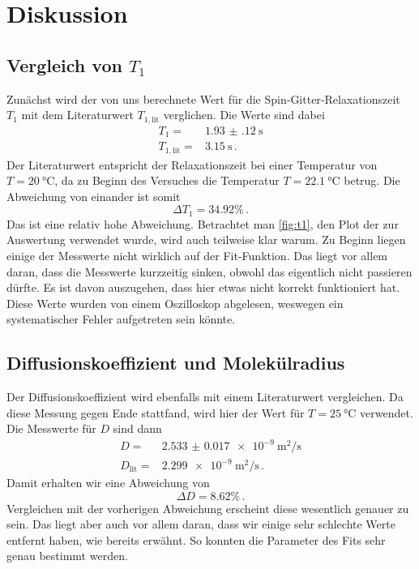 \section{Diskussion}
\label{sec:Diskussion}

\subsection{Vergleich von $T_1$}

Zunächst wird der von uns berechnete Wert für die Spin‐Gitter‐Relaxationszeit $T_1$ mit dem Literaturwert $T_{1,\text{lit}}$ verglichen. \cite{T1}
Die Werte sind dabei 
\begin{align*}
    T_1 =& \SI{1.93(12)}{\second} \\
    T_{1,\text{lit}} =& \SI{3.15}{\second} \, .
\end{align*}
Der Literaturwert entspricht der Relaxationszeit bei einer Temperatur von $T = \SI{20}{\celsius}$, da zu Beginn des Versuches die Temperatur 
$T = \SI{22.1}{\celsius}$ betrug.
Die Abweichung von einander ist somit
\begin{equation}
    \Delta T_1 = \num{34.92} \% \, .
\end{equation}
Das ist eine relativ hohe Abweichung.
Betrachtet man \autoref{fig:t1}, den Plot der zur Auswertung verwendet wurde, wird auch teilweise klar warum.
Zu Beginn liegen einige der Messwerte nicht wirklich auf der Fit-Funktion.
Das liegt vor allem daran, dass die Messwerte kurzzeitig sinken, obwohl das eigentlich nicht passieren dürfte.
Es ist davon auszugehen, dass hier etwas nicht korrekt funktioniert hat. 
Diese Werte wurden von einem Oszilloskop abgelesen, weswegen ein systematischer Fehler aufgetreten sein könnte.

\subsection{Diffusionskoeffizient und Molekülradius}

Der Diffusionskoeffizient wird ebenfalls mit einem Literaturwert vergleichen. 
Da diese Messung gegen Ende stattfand, wird hier der Wert für $T = \SI{25}{\celsius}$ verwendet. \cite{D}
Die Messwerte für $D$ sind dann
\begin{align*}
    D =& \SI{2.533(17)e-9}{\meter\squared\per\second} \\
    D_\text{lit} =& \SI{2.299e-9}{\meter\squared\per\second} \, .
\end{align*}
Damit erhalten wir eine Abweichung von 
\begin{equation}
    \Delta D = \num{8.62} \% \, .
\end{equation}
Vergleichen mit der vorherigen Abweichung erscheint diese wesentlich genauer zu sein. 
Das liegt aber auch vor allem daran, dass wir einige sehr schlechte Werte entfernt haben, wie bereits erwähnt. 
So konnten die Parameter des Fits sehr genau bestimmt werden.

